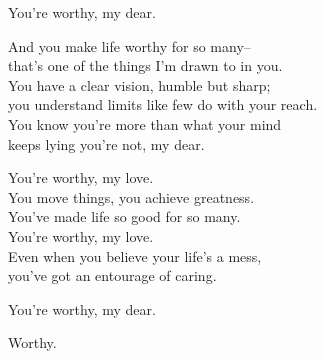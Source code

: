 \begin{lyrics}
You're worthy, my dear.

And you make life worthy for so many--\\
that's one of the things I'm drawn to in you.\\
You have a clear vision, humble but sharp;\\
you understand limits like few do with your reach.\\
You know you're more than what your mind\\
keeps lying you're not, my dear.

You're worthy, my love.\\
You move things, you achieve greatness.\\
You've made life so good for so many.\\
You're worthy, my love.\\
Even when you believe your life's a mess,\\
you've got an entourage of caring.

You're worthy, my dear.

Worthy.
\end{lyrics}

